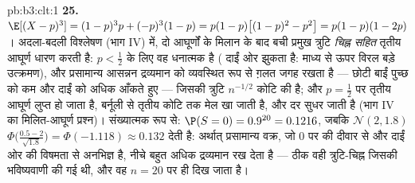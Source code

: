 \begin{solution}{pb:b3:clt:1}
\textbf{25.} $\E[(X - p)^3] = (1-p)^3p + (-p)^3(1 - p) =
p(1-p)\bigl[(1-p)^2 - p^2\bigr] = p(1-p)(1 - 2p)$।
अदला-बदली विश्लेषण (भाग IV) में, दो आघूर्णों के मिलान के बाद
बची प्रमुख त्रुटि \emph{चिह्न सहित} तृतीय आघूर्ण धारण करती
है: $p < \frac12$ के लिए वह धनात्मक है ( दाईं ओर
झुकता है: माध्य से ऊपर विरल बड़े उत्क्रमण), और प्रसामान्य
आसन्नन द्रव्यमान को व्यवस्थित रूप से ग़लत जगह रखता है ---
छोटी बाईं पुच्छ को कम और दाईं को अधिक आँकते हुए --- जिसकी
त्रुटि $n^{-1/2}$ कोटि की है; और $p =
\frac12$ पर तृतीय आघूर्ण लुप्त हो जाता है, बर्नूली  से
तृतीय कोटि तक मेल खा जाती है, और दर सुधर जाती है (भाग IV का
मिलित-आघूर्ण प्रश्न)। संख्यात्मक रूप से: $\P(S = 0) =
0.9^{20} = 0.1216$, जबकि 
$\mathcal N(2, 1.8)$ $\Phi\bigl(\frac{0.5 -
2}{\sqrt{1.8}}\bigr) = \Phi(-1.118) \approx 0.132$ देती है:
अर्थात् प्रसामान्य वक्र, जो $0$ पर की दीवार से और दाईं ओर की
विषमता से अनभिज्ञ है, नीचे बहुत अधिक द्रव्यमान रख देता है ---
ठीक वही त्रुटि-चिह्न जिसकी भविष्यवाणी की गई थी, और वह $n =
20$ पर ही दिख जाता है।
\end{solution}
